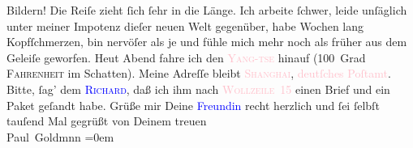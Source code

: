               Bildern! {\pb}Die Reiſe zieht ſich ſehr in die Länge.
               Ich arbeite ſchwer, leide unſäglich unter meiner Impotenz\strikeout{,} dieſer neuen Welt gegenüber, habe Wochen lang Kopfſchmerzen, bin nervöſer
               als je und fühle mich\strikeout{,} mehr noch als früher aus dem
               Geleiſe geworfen. Heut{ }Abend fahre ich den \textsc{\textcolor{pink}{Yang-tse}{}\ledrightnote{\textcolor{pink}{Jangtsekiang}}} hinauf (100 Grad \textsc{Fahrenheit} im Schatten). Meine
               Adreſſe bleibt \textsc{\textcolor{pink}{Shanghai}{}\ledrightnote{\textcolor{pink}{Shanghai}}}, {\pb}\textcolor{pink}{deutſches Poſtamt}{}. Bitte, ſag’
               dem \textsc{\textcolor{blue}{Richard}{}\ledrightnote{\textcolor{blue}{Richard Beer-Hofmann}}}, daß ich ihm nach \textcolor{pink}{\textsc{Wollzeile} 15}{}\ledrightnote{\textcolor{pink}{Wollzeile}} einen Brief und ein Paket geſandt
               habe. \pend
           \pstart
            Grüße mir Deine \textcolor{blue}{Freundin}{} recht herzlich und ſei ſelbſt tauſend Mal gegrüßt von Deinem
               treuen{\\[\baselineskip]}\spacefill\mbox{Paul Goldmnn}\pend
           \leftskip=0em{}\endnumbering{}  
      
